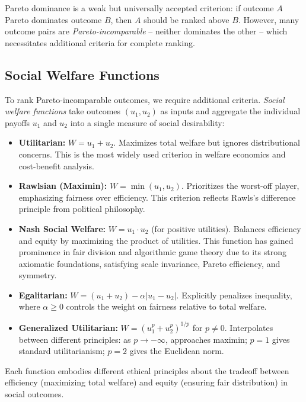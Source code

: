 \documentclass[11pt]{amsart}
\begin{document}
Pareto dominance is a weak but universally accepted criterion: if outcome $A$ Pareto dominates outcome $B$, then $A$ should be ranked above $B$. However, many outcome pairs are \textit{Pareto-incomparable} -- neither dominates the other -- which necessitates additional criteria for complete ranking.

\subsection{Social Welfare Functions}

To rank Pareto-incomparable outcomes, we require additional criteria. \textit{Social welfare functions} take outcomes $(u_1, u_2)$ as inputs and aggregate the individual payoffs $u_1$ and $u_2$ into a single measure of social desirability:

\begin{itemize}
    \item \textbf{Utilitarian:} $W = u_1 + u_2$. Maximizes total welfare but ignores distributional concerns. This is the most widely used criterion in welfare economics and cost-benefit analysis.
    
    \item \textbf{Rawlsian (Maximin):} $W = \min(u_1, u_2)$. Prioritizes the worst-off player, emphasizing fairness over efficiency. This criterion reflects Rawls's difference principle from political philosophy.
    
    \item \textbf{Nash Social Welfare:} $W = u_1 \cdot u_2$ (for positive utilities). Balances efficiency and equity by maximizing the product of utilities. This function has gained prominence in fair division and algorithmic game theory due to its strong axiomatic foundations, satisfying scale invariance, Pareto efficiency, and symmetry.
    
    \item \textbf{Egalitarian:} $W = (u_1 + u_2) - \alpha|u_1 - u_2|$. Explicitly penalizes inequality, where $\alpha \geq 0$ controls the weight on fairness relative to total welfare.
    
    \item \textbf{Generalized Utilitarian:} $W = (u_1^p + u_2^p)^{1/p}$ for $p \neq 0$. Interpolates between different principles: as $p \to -\infty$, approaches maximin; $p = 1$ gives standard utilitarianism; $p = 2$ gives the Euclidean norm.
\end{itemize}

Each function embodies different ethical principles about the tradeoff between efficiency (maximizing total welfare) and equity (ensuring fair distribution) in social outcomes.
\end{document}
